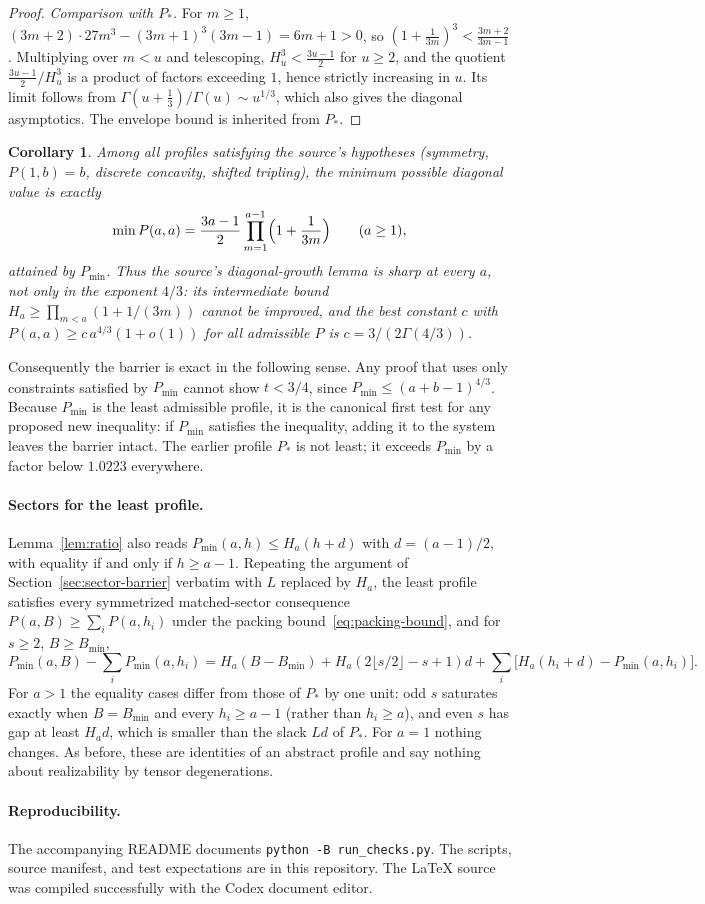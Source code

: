 \documentclass[11pt]{article}
\newtheorem{corollary}{Corollary}
\begin{document}
\begin{proof}
\emph{Comparison with $P_*$.} For $m\ge1$,
$(3m+2)\cdot27m^3-(3m+1)^3(3m-1)=6m+1>0$, so
$(1+\frac1{3m})^3<\frac{3m+2}{3m-1}$. Multiplying over $m<u$ and
telescoping, $H_u^3<\frac{3u-1}2$ for $u\ge2$, and the quotient
$\frac{3u-1}{2}/H_u^3$ is a product of factors exceeding $1$, hence
strictly increasing in $u$. Its limit follows from
$\Gamma(u+\tfrac13)/\Gamma(u)\sim u^{1/3}$, which also gives the
diagonal asymptotics. The envelope bound is inherited from $P_*$.
\end{proof}

\begin{corollary}\label{cor:sharp}
Among all profiles satisfying the source's hypotheses (symmetry,
$P(1,b)=b$, discrete concavity, shifted tripling), the minimum possible
diagonal value is exactly
\[
 \min P(a,a)=\frac{3a-1}{2}\prod_{m=1}^{a-1}\Bigl(1+\frac1{3m}\Bigr)
 \qquad(a\ge1),
\]
attained by $P_{\min}$. Thus the source's diagonal-growth lemma is sharp
at every $a$, not only in the exponent $4/3$: its intermediate bound
$H_a\ge\prod_{m<a}(1+1/(3m))$ cannot be improved, and the best constant
$c$ with $P(a,a)\ge c\,a^{4/3}(1+o(1))$ for all admissible $P$ is
$c=3/(2\Gamma(4/3))$.
\end{corollary}

Consequently the barrier is exact in the following sense. Any proof
that uses only constraints satisfied by $P_{\min}$ cannot show $t<3/4$,
since $P_{\min}\le(a+b-1)^{4/3}$. Because $P_{\min}$ is the least
admissible profile, it is the canonical first test for any proposed new
inequality: if $P_{\min}$ satisfies the inequality, adding it to the
system leaves the barrier intact. The earlier profile $P_*$ is not
least; it exceeds $P_{\min}$ by a factor below $1.0223$ everywhere.

\paragraph{Sectors for the least profile.}
Lemma~\ref{lem:ratio} also reads
$P_{\min}(a,h)\le H_a(h+d)$ with $d=(a-1)/2$, with equality if and only
if $h\ge a-1$. Repeating the argument of
Section~\ref{sec:sector-barrier} verbatim with $L$ replaced by $H_a$,
the least profile satisfies every symmetrized matched-sector
consequence $P(a,B)\ge\sum_iP(a,h_i)$ under the packing
bound~\eqref{eq:packing-bound}, and for $s\ge2$, $B\ge B_{\min}$,
\[
 P_{\min}(a,B)-\sum_iP_{\min}(a,h_i)
 =H_a(B-B_{\min})+H_a(2\lfloor s/2\rfloor-s+1)d
  +\sum_i\bigl[H_a(h_i+d)-P_{\min}(a,h_i)\bigr].
\]
For $a>1$ the equality cases differ from those of $P_*$ by one unit:
odd $s$ saturates exactly when $B=B_{\min}$ and every $h_i\ge a-1$
(rather than $h_i\ge a$), and even $s$ has gap at least $H_ad$, which
is smaller than the slack $Ld$ of $P_*$. For $a=1$ nothing changes.
As before, these are identities of an abstract profile and say nothing
about realizability by tensor degenerations.

\paragraph{Reproducibility.}
The accompanying README documents \texttt{python -B run\_checks.py}.
The scripts, source manifest, and test expectations are in this repository.
The LaTeX source was compiled successfully with the Codex document editor.
\end{document}
